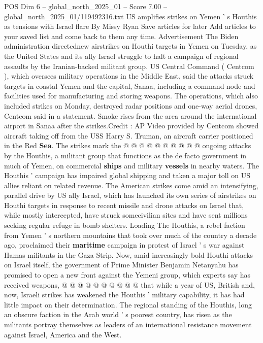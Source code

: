 \begin{textsample}{POS Dim 6 – global\_north\_2025\_01 – Score 7.00 – global\_north\_2025\_01/119492316.txt}  \label{ex:f6_pos_342}
US amplifies strikes on Yemen ' s Houthis as tensions with Israel flare By Missy Ryan Save articles for later Add articles to your saved list and come back to them any time.
Advertisement The Biden administration directednew airstrikes on Houthi targets in Yemen on Tuesday, as the United States and its ally Israel struggle to halt a campaign of regional assaults by the Iranian-backed militant group.
US Central Command ( Centcom ), which oversees military operations in the Middle East, said the attacks struck targets in coastal Yemen and the capital, Sanaa, including a command node and facilities used for manufacturing and storing weapons.
The operations, which also included strikes on Monday, destroyed radar positions and one-way aerial drones, Centcom said in a statement.
Smoke rises from the area around the international airport in Sanaa after the strikes.Credit : AP Video provided by Centcom showed aircraft taking off from the USS Harry S.
Truman, an aircraft carrier positioned in the Red \textbf{Sea}.
The strikes mark the @ @ @ @ @ @ @ @ @ @ ongoing attacks by the Houthis, a militant group that functions as the de facto government in much of Yemen, on commercial \textbf{ships} and military \textbf{vessels} in nearby waters.
The Houthis ' campaign has impaired global shipping and taken a major toll on US allies reliant on related revenue.
The American strikes come amid an intensifying, parallel drive by US ally Israel, which has launched its own series of airstrikes on Houthi targets in response to recent missile and drone attacks on Israel that, while mostly intercepted, have struck somecivilian sites and have sent millions seeking regular refuge in bomb shelters.
Loading The Houthis, a rebel faction from Yemen ' s northern mountains that took over much of the country a decade ago, proclaimed their \textbf{maritime} campaign in protest of Israel ' s war against Hamas militants in the Gaza Strip.
Now, amid increasingly bold Houthi attacks on Israel itself, the government of Prime Minister Benjamin Netanyahu has promised to open a new front against the Yemeni group, which experts say has received weapons, @ @ @ @ @ @ @ @ @ @ that while a year of US, British and, now, Israeli strikes has weakened the Houthis ' military capability, it has had little impact on their determination.
The regional standing of the Houthis, long an obscure faction in the Arab world ' s poorest country, has risen as the militants portray themselves as leaders of an international resistance movement against Israel, America and the West.

\end{textsample}
